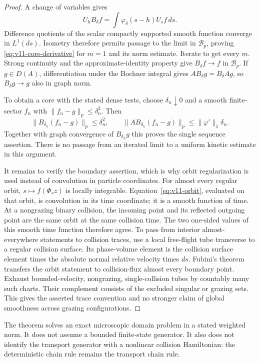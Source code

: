 \begin{proof}
A change of variables gives
\[
 U_h B_\delta f=\int\varphi_\delta(s-h)U_sf\,ds.
\]
Difference quotients of the scalar compactly supported smooth function
converge in $L^1(ds)$. Isometry therefore permits passage to the limit in
$\mathcal B_p$, proving \eqref{eq:v11-core-derivative} for $m=1$ and its
norm estimate. Iterate to get every $m$. Strong continuity and the
approximate-identity property give $B_\delta f\to f$ in $\mathcal B_p$.
If $g\in D(A)$, differentiation under the Bochner integral gives
$AB_\delta g=B_\delta Ag$, so $B_\delta g\to g$ also in graph norm.

To obtain a core with the stated dense tests, choose $\delta_n\downarrow0$
and a smooth finite-sector $f_n$ with $\|f_n-g\|_p\le\delta_n^2$.
Then
\[
 \|B_{\delta_n}(f_n-g)\|_p\le\delta_n^2,
 \qquad
 \|AB_{\delta_n}(f_n-g)\|_p
       \le\|\varphi'\|_1\delta_n.
\]
Together with graph convergence of $B_{\delta_n}g$ this proves the single
sequence assertion. There is no passage from an iterated limit to a
uniform kinetic estimate in this argument.

It remains to verify the boundary assertion, which is why orbit
regularization is used instead of convolution in particle coordinates.
For almost every regular orbit, $s\mapsto f(\Phi_sz)$ is locally
integrable. Equation~\eqref{eq:v11-orbit}, evaluated on that orbit,
is convolution in its time coordinate; it is a smooth function of time.
At a nongrazing binary collision, the incoming point and its reflected
outgoing point are the same orbit at the same collision time. The two
one-sided values of this smooth time function therefore agree. To pass
from interior almost-everywhere statements to collision traces, use a
local free-flight tube transverse to a regular collision surface. Its
phase-volume element is the collision surface element times the absolute
normal relative velocity times $ds$. Fubini's theorem transfers the
orbit statement to collision-flux almost every boundary point. Exhaust
bounded-velocity, nongrazing, single-collision tubes by countably many
such charts. Their complement consists of the excluded singular or
grazing sets. This gives the asserted trace convention and no stronger
claim of global smoothness across grazing configurations.
\end{proof}

The theorem solves an exact microscopic domain problem in a stated
weighted norm. It does not assume a bounded finite-state generator.
It also does not identify the transport generator with a nonlinear
collision Hamiltonian: the deterministic chain rule remains the
transport chain rule.

